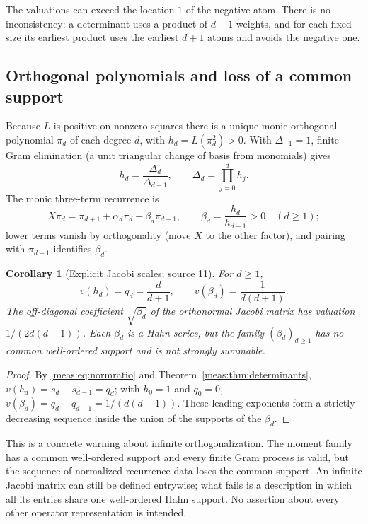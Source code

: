 \documentclass[11pt]{article}
\numberwithin{equation}{section}
\newtheorem{corollary}[theorem]{Corollary}
\theoremstyle{definition}
\theoremstyle{remark}
\begin{document}
The valuations can exceed the location $1$ of the negative atom. There is no
inconsistency: a determinant uses a product of $d+1$ weights, and for each fixed
size its earliest product uses the earliest $d+1$ atoms and avoids the negative
one.

\subsection{Orthogonal polynomials and loss of a common support}

Because $L$ is positive on nonzero squares there is a unique monic orthogonal
polynomial $\pi_d$ of each degree $d$, with $h_d=L(\pi_d^2)>0$. With
$\Delta_{-1}=1$, finite Gram elimination (a unit triangular change of basis from
monomials) gives
\begin{equation}\label{meas:eq:normratio}
 h_d=\frac{\Delta_d}{\Delta_{d-1}},\qquad \Delta_d=\prod_{j=0}^dh_j .
\end{equation}
The monic three-term recurrence is
\begin{equation}\label{meas:eq:three}
 X\pi_d=\pi_{d+1}+\alpha_d\pi_d+\beta_d\pi_{d-1},\qquad
 \beta_d=\frac{h_d}{h_{d-1}}>0\quad(d\ge1);
\end{equation}
lower terms vanish by orthogonality (move $X$ to the other factor), and pairing
with $\pi_{d-1}$ identifies $\beta_d$.

\begin{corollary}[Explicit Jacobi scales; source 11]\label{meas:cor:jacobi}
For $d\ge1$,
\begin{equation}\label{meas:eq:jacobivals}
 v(h_d)=q_d=\frac d{d+1},\qquad v(\beta_d)=\frac1{d(d+1)}.
\end{equation}
The off-diagonal coefficient $\sqrt{\beta_d}$ of the orthonormal Jacobi matrix has
valuation $1/(2d(d+1))$. Each $\beta_d$ is a Hahn series, but the family
$(\beta_d)_{d\ge1}$ has no common well-ordered support and is not strongly
summable.
\end{corollary}
\begin{proof}
By \eqref{meas:eq:normratio} and Theorem~\ref{meas:thm:determinants},
$v(h_d)=s_d-s_{d-1}=q_d$; with $h_0=1$ and $q_0=0$,
$v(\beta_d)=q_d-q_{d-1}=1/(d(d+1))$. These leading exponents form a strictly
decreasing sequence inside the union of the supports of the $\beta_d$.
\end{proof}

This is a concrete warning about infinite orthogonalization. The moment family
has a common well-ordered support and every finite Gram process is valid, but
the sequence of normalized recurrence data loses the common support. An
infinite Jacobi matrix can still be defined entrywise; what fails is a
description in which all its entries share one well-ordered Hahn support. No
assertion about every other operator representation is intended.
\end{document}

